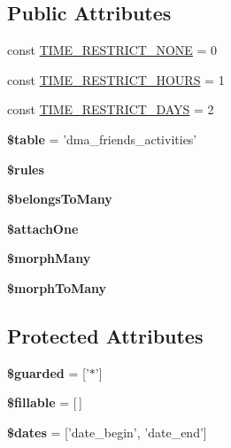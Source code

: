 \subsection*{Public Attributes}
\begin{DoxyCompactItemize}
\item 
const \hyperlink{classDMA_1_1Friends_1_1Models_1_1Activity_ab9dd8b18c4810beabdcf8e45039913c8}{T\+I\+M\+E\+\_\+\+R\+E\+S\+T\+R\+I\+C\+T\+\_\+\+N\+O\+N\+E} = 0
\item 
const \hyperlink{classDMA_1_1Friends_1_1Models_1_1Activity_ac78040e8784e02c2d1bcce5221ac6cb8}{T\+I\+M\+E\+\_\+\+R\+E\+S\+T\+R\+I\+C\+T\+\_\+\+H\+O\+U\+R\+S} = 1
\item 
const \hyperlink{classDMA_1_1Friends_1_1Models_1_1Activity_a71b85478f20cda144aeffe010364a0f7}{T\+I\+M\+E\+\_\+\+R\+E\+S\+T\+R\+I\+C\+T\+\_\+\+D\+A\+Y\+S} = 2
\item 
\hypertarget{classDMA_1_1Friends_1_1Models_1_1Activity_a2ded517047c73d831aef535c8adc6690}{{\bfseries \$table} = 'dma\+\_\+friends\+\_\+activities'}\label{classDMA_1_1Friends_1_1Models_1_1Activity_a2ded517047c73d831aef535c8adc6690}

\item 
{\bfseries \$rules}
\item 
{\bfseries \$belongs\+To\+Many}
\item 
{\bfseries \$attach\+One}
\item 
{\bfseries \$morph\+Many}
\item 
{\bfseries \$morph\+To\+Many}
\end{DoxyCompactItemize}
\subsection*{Protected Attributes}
\begin{DoxyCompactItemize}
\item 
\hypertarget{classDMA_1_1Friends_1_1Models_1_1Activity_ac82a10f722788b5c1c7a5295e1ac10c2}{{\bfseries \$guarded} = \mbox{[}'$\ast$'\mbox{]}}\label{classDMA_1_1Friends_1_1Models_1_1Activity_ac82a10f722788b5c1c7a5295e1ac10c2}

\item 
\hypertarget{classDMA_1_1Friends_1_1Models_1_1Activity_ab2a7401215dff9dfd8b600247b12454a}{{\bfseries \$fillable} = \mbox{[}$\,$\mbox{]}}\label{classDMA_1_1Friends_1_1Models_1_1Activity_ab2a7401215dff9dfd8b600247b12454a}

\item 
\hypertarget{classDMA_1_1Friends_1_1Models_1_1Activity_afe94503fbf177345e4bf0b1625dee499}{{\bfseries \$dates} = \mbox{[}'date\+\_\+begin', 'date\+\_\+end'\mbox{]}}\label{classDMA_1_1Friends_1_1Models_1_1Activity_afe94503fbf177345e4bf0b1625dee499}

\end{DoxyCompactItemize}



